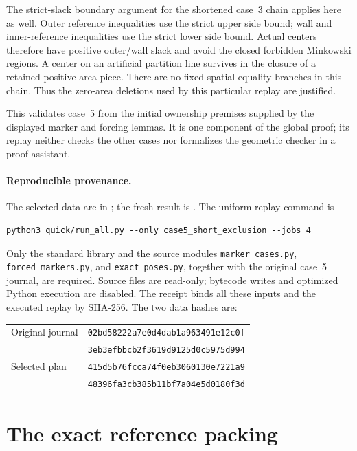\documentclass[11pt]{article}
\begin{document}
The strict-slack boundary argument for the shortened case~3 chain applies
here as well.  Outer reference inequalities use the strict upper side
bound; wall and inner-reference inequalities use the strict lower side
bound.  Actual centers therefore have positive outer/wall slack and avoid
the closed forbidden Minkowski regions.  A center on an artificial
partition line survives in the closure of a retained positive-area piece.
There are no fixed spatial-equality branches in this chain.  Thus the
zero-area deletions used by this particular replay are justified.

This validates case~5 from the initial ownership premises supplied by
the displayed marker and forcing lemmas. It is one component of the global
proof; its replay neither checks the other cases nor formalizes the
geometric checker in a proof assistant.

\paragraph{Reproducible provenance.}
The selected data are in ; the fresh result is
.  The uniform replay command is
\begin{verbatim}
python3 quick/run_all.py --only case5_short_exclusion --jobs 4
\end{verbatim}
Only the standard library and the source modules
\texttt{marker\_cases.py}, \texttt{forced\_markers.py}, and
\texttt{exact\_poses.py}, together with the original case~5 journal,
are required.  Source files are read-only; bytecode writes and optimized
Python execution are disabled.  The receipt binds all these inputs and the
executed replay by SHA-256.  The two data hashes are:
\begin{center}
\small
\begin{tabular}{l l}
Original journal & \texttt{02bd58222a7e0d4dab1a963491e12c0f}\\
 & \texttt{3eb3efbbcb2f3619d9125d0c5975d994}\\
Selected plan & \texttt{415d5b76fcca74f0eb3060130e7221a9}\\
 & \texttt{48396fa3cb385b11bf7a04e5d0180f3d}\\
\end{tabular}
\end{center}


\section{The exact reference packing}
\label{construction:exact}
\end{document}
